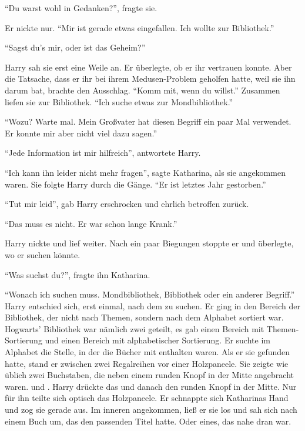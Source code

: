 \enquote{Du warst wohl in Gedanken?}, fragte sie.

Er nickte nur. \enquote{Mir ist gerade etwas eingefallen. Ich wollte zur Bibliothek.}

\enquote{Sagst du’s mir, oder ist das Geheim?}

Harry sah sie erst eine Weile an. Er überlegte, ob er ihr vertrauen konnte. Aber die Tatsache, dass er ihr bei ihrem Medusen-Problem geholfen hatte, weil sie ihn darum bat, brachte den Ausschlag. \enquote{Komm mit, wenn du willst.} Zusammen liefen sie zur Bibliothek. \enquote{Ich suche etwas zur Mondbibliothek.}

\enquote{Wozu? \gst Warte mal. Mein Großvater hat diesen Begriff ein paar Mal verwendet. Er konnte mir aber nicht viel dazu sagen.}

\enquote{Jede Information ist mir hilfreich}, antwortete Harry.

\enquote{Ich kann ihn leider nicht mehr fragen}, sagte Katharina, als sie angekommen waren. Sie folgte Harry durch die Gänge. \enquote{Er ist letztes Jahr gestorben.}

\enquote{Tut mir leid}, gab Harry erschrocken und ehrlich betroffen zurück.

\enquote{Das muss es nicht. Er war schon lange Krank.}

Harry nickte und lief weiter. Nach ein paar Biegungen stoppte er und überlegte, wo er suchen könnte.

\enquote{Was suchst du?}, fragte ihn Katharina.

\enquote{Wonach ich suchen muss. Mondbibliothek, Bibliothek oder ein anderer Begriff.} Harry entschied sich, erst einmal, nach dem  zu suchen. Er ging in den Bereich der Bibliothek, der nicht nach Themen, sondern nach dem Alphabet sortiert war. Hogwarts’ Bibliothek war nämlich zwei geteilt, es gab einen Bereich mit Themen-Sortierung und einen Bereich mit alphabetischer Sortierung. Er suchte im Alphabet die Stelle, in der die Bücher mit  enthalten waren. Als er sie gefunden hatte, stand er zwischen zwei Regalreihen vor einer Holzpaneele. Sie zeigte wie üblich zwei Buchstaben, die neben einem runden Knopf in der Mitte angebracht waren.  und . Harry drückte das  und danach den runden Knopf in der Mitte. Nur für ihn teilte sich optisch das Holzpaneele. Er schnappte sich Katharinas Hand und zog sie gerade aus. Im inneren angekommen, ließ er sie los und sah sich nach einem Buch um, das den passenden Titel hatte. Oder eines, das nahe dran war.

